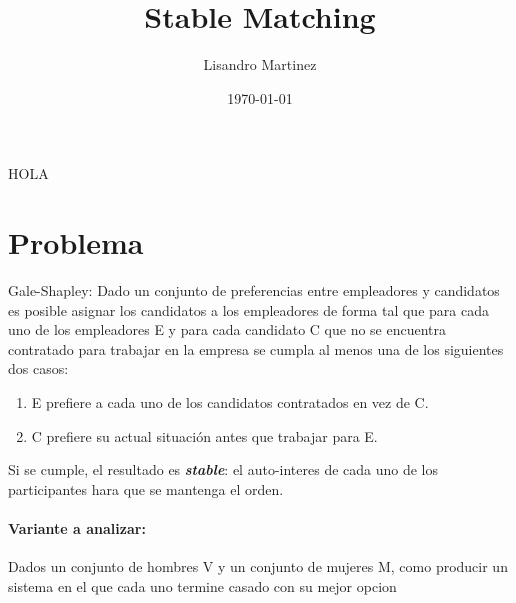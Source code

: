 \documentclass[12pt, fleqn]{article}
\title{Stable Matching}
\author{Lisandro Martinez}
\date{\today}
\theoremstyle{remark}
\theoremstyle{definition}
\begin{document}
\maketitle{}
HOLA
\section{Problema}
Gale-Shapley: Dado un conjunto de preferencias entre empleadores y candidatos
es posible asignar los candidatos a los empleadores de forma tal que para
cada uno de los empleadores E y para cada candidato C que no se encuentra 
contratado para trabajar en la empresa
se cumpla al menos una de los siguientes dos casos:
\begin{enumerate}
    \item E prefiere a cada uno de los candidatos contratados en vez de C.
    \item C prefiere su actual situación antes que trabajar para E.
\end{enumerate}
    Si se cumple, el resultado es \textbf{\emph{stable}}: 
    el auto-interes de cada uno de los participantes hara que se mantenga el orden.
\paragraph{Variante a analizar:}
    Dados un conjunto de hombres V y un conjunto de mujeres M, como producir un sistema 
    en el que cada uno termine casado con su mejor opcion
\end{document}
